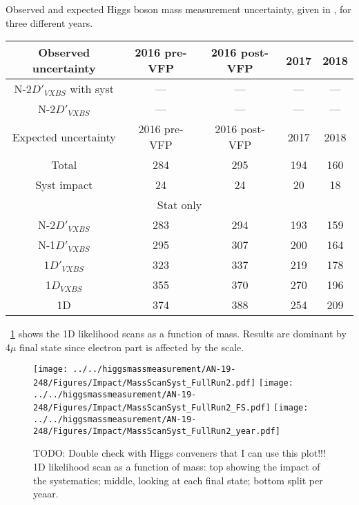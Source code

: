 \begin{table}[ht]	
\begin{center}
    \topcaption
    {Observed and expected Higgs boson mass measurement uncertainty, 
    given in \MeVns, for three different years.}
    \begin{tabular}{ccccc}
    \hline			
    Observed uncertainty	&	2016 pre-VFP	&	2016 post-VFP	&	2017	&	2018	\\
    \hline			
    N-2$D'_{VXBS}$ with syst	&	---	&	---	&	---	&	---\\
    N-2$D'_{VXBS}$	&	---	&	---	&	---	&	---\\
    \hline			
    \hline			
    Expected uncertainty	&	2016 pre-VFP	&	2016 post-VFP	&	2017	&	2018	\\
    \hline			
    Total	&	284	&	295	&	194	&	160	\\
    \hline			
    Syst impact	&	24	&	24	&	20	&	18	\\
    \hline
    \multicolumn{5}{c}{Stat only}\\
    \hline
    N-2$D'_{VXBS}$	&	283	&	294	&	193	&	159	\\
    N-1$D'_{VXBS}$	&	295	&	307	&	200	&	164	\\
    1$D'_{VXBS}$	&	323	&	337	&	219	&	178	\\
    1$D_{VXBS}$		&	355	&	370	&	270	&	196	\\
    1D				&	374	&	388	&	254	&	209	\\
    \hline			
    \end{tabular}
    \label{table:2D_refit_result_finals_year}
\end{center}
\end{table}
\figurename~\ref{mass_scan} shows the 1D likelihood scans as a function of mass.
Results are dominant by 4$\mu$ final state since electron part is affected by the scale.
\begin{figure}[!htbp]
\begin{center}
	\texttt{[image: ../../higgsmassmeasurement/AN-19-248/Figures/Impact/MassScanSyst\_FullRun2.pdf]}
	\texttt{[image: ../../higgsmassmeasurement/AN-19-248/Figures/Impact/MassScanSyst\_FullRun2\_FS.pdf]}
	\texttt{[image: ../../higgsmassmeasurement/AN-19-248/Figures/Impact/MassScanSyst\_FullRun2\_year.pdf]}
	\caption{TODO: Double check with Higgs conveners that I can use this plot!!! 1D likelihood scan as a function of mass: top showing the impact of the systematics;
	middle, looking at each final state; bottom split per yeaar.}
	\label{mass_scan}
\end{center}
\end{figure}

